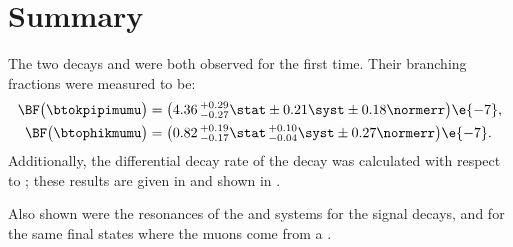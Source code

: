 \section{Summary}
\label{sec:hhh:conc}

The two \fcnc decays \btokpipimumu and \btophikmumu were both observed for the first time.
Their branching fractions were measured to be:
\begin{align*}
  \BF\big( \btokpipimumu \big)&=
  \big(4.36\,^{+0.29}_{-0.27}\stat\pm0.21\syst\pm0.18\normerr\big)\e{-7}, \\
  \BF\big(\btophikmumu\big)&=
  \big(0.82\,^{+0.19}_{-0.17}\stat\,^{+0.10}_{-0.04}\syst\pm0.27\normerr\big)\e{-7}.
\end{align*}
Additionally, the differential decay rate of the decay \btokpipimumu was calculated with respect to
\qsq; these results are given in  and shown in .

Also shown were the resonances of the \kpipi and \phik systems for the signal decays, and for the
same final states where the muons come from a \jpsi.


%
%
%




